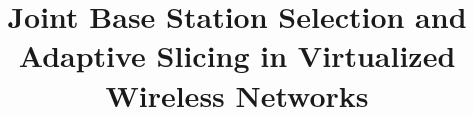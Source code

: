 \documentclass[onecolumn,draftcls]{IEEEtran}
\begin{document}
%
\title{Joint Base Station Selection and Adaptive Slicing in Virtualized Wireless Networks}

\author{
}

\end{document}
